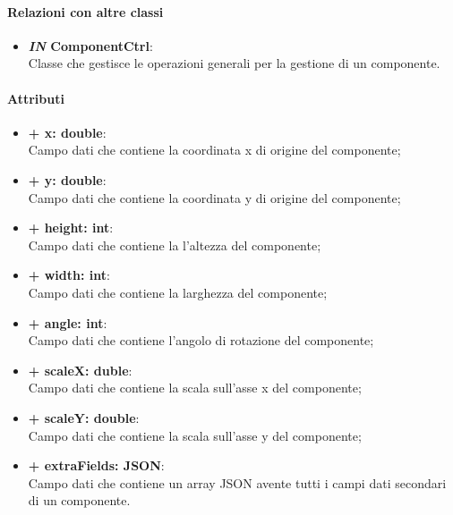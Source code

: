 	\paragraph{Relazioni con altre classi}
	\begin{itemize}
		\item \textbf{\textit{IN} ComponentCtrl}:\\
		Classe che gestisce le operazioni generali per la gestione di un componente.
	\end{itemize}
	
	\paragraph{Attributi}
	\begin{itemize}
		\item \textbf{+ x: double}:\\
			Campo dati che contiene la coordinata x di origine del componente;
		\item \textbf{+ y: double}:\\
			Campo dati che contiene la coordinata y di origine del componente;
		\item \textbf{+ height: int}:\\
			Campo dati che contiene la l'altezza del componente;
		\item \textbf{+ width: int}:\\
			Campo dati che contiene la larghezza del componente;
		\item \textbf{+ angle: int}:\\
			Campo dati che contiene l'angolo di rotazione del componente;
		\item \textbf{+ scaleX: duble}:\\
			Campo dati che contiene la scala sull'asse x del componente;
		\item \textbf{+ scaleY: double}:\\
			Campo dati che contiene la scala sull'asse y del componente;
		\item \textbf{+ extraFields: JSON}:\\
			Campo dati che contiene un array \gls{JSON} avente tutti i campi dati secondari di un componente.
	\end{itemize}
\newpage
	

